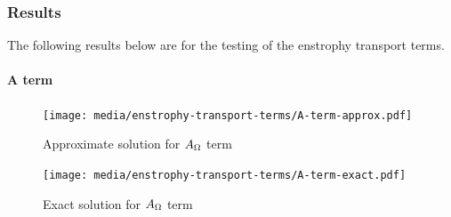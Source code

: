 \subsubsection{Results}
The following results below are for the testing of the enstrophy transport
terms.
\paragraph{A term}
\begin{figure}[H]
    \texttt{[image: media/enstrophy-transport-terms/A-term-approx.pdf]}
    \caption{Approximate solution for $A_{\Omega}$ term}
    \label{fig:a-approx}
\end{figure}
\begin{figure}[H]
    \texttt{[image: media/enstrophy-transport-terms/A-term-exact.pdf]}
    \caption{Exact solution for $A_{\Omega}$ term}
    \label{fig:a-exact}
\end{figure}
